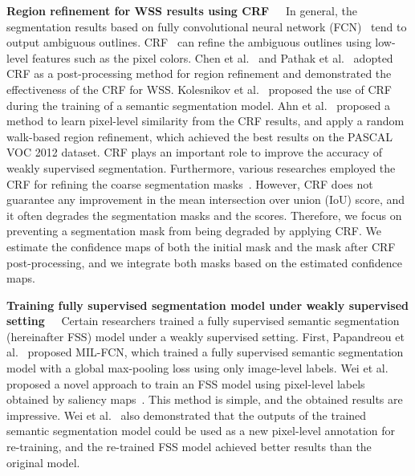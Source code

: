 \documentclass[10pt,twocolumn,letterpaper]{article}
\begin{document}
\noindent
{\bf Region refinement for WSS results using CRF~~}
In general, the segmentation results based on fully convolutional neural network (FCN)~\cite{long15} tend to output ambiguous outlines.
CRF~\cite{kra11} can refine the ambiguous outlines using low-level features such as the pixel colors.
Chen et al.~\cite{papa15} and Pathak et al.~\cite{Pathak15} adopted CRF as a post-processing method for region refinement and demonstrated the effectiveness of the CRF for WSS.
Kolesnikov et al.~\cite{sec} proposed the use of CRF during the training of
a semantic segmentation model.
Ahn et al.~\cite{psa} proposed a method to learn pixel-level similarity from the CRF results,
and apply a random walk-based region refinement, 
which achieved the best results on the PASCAL VOC 2012 dataset.
CRF plays an important role to improve the accuracy of weakly supervised segmentation.
Furthermore, various researches employed the CRF for refining the coarse segmentation masks~\cite{dcsm,bfb,cbts,tphase,stc,erasing,seenet,cvpr18web}.
However, CRF does not guarantee any improvement in the mean intersection over union (IoU) score, 
and it often degrades the segmentation masks and the scores.
Therefore, we focus on preventing a segmentation mask from being degraded by applying CRF.
We estimate the confidence maps of both the initial mask and the mask after 
CRF post-processing, and we integrate both masks based on the estimated confidence maps.

\noindent
{\bf Training fully supervised segmentation model under weakly supervised setting~~}
Certain researchers trained a fully supervised semantic segmentation (hereinafter FSS) model 
under a weakly supervised setting.
First, Papandreou et al.~\cite{Pathak215} proposed MIL-FCN, which trained a fully supervised semantic segmentation model 
with a global max-pooling loss using only image-level labels.
Wei et al.~\cite{stc} proposed a novel approach to train an FSS model using pixel-level labels obtained by saliency maps~\cite{drfi}.
This method is simple, and the obtained results are impressive. 
Wei et al.~\cite{stc} also demonstrated that the outputs of the trained semantic segmentation model could be used as a new pixel-level annotation for re-training,
and the re-trained FSS model achieved better results than the original model.
\end{document}
